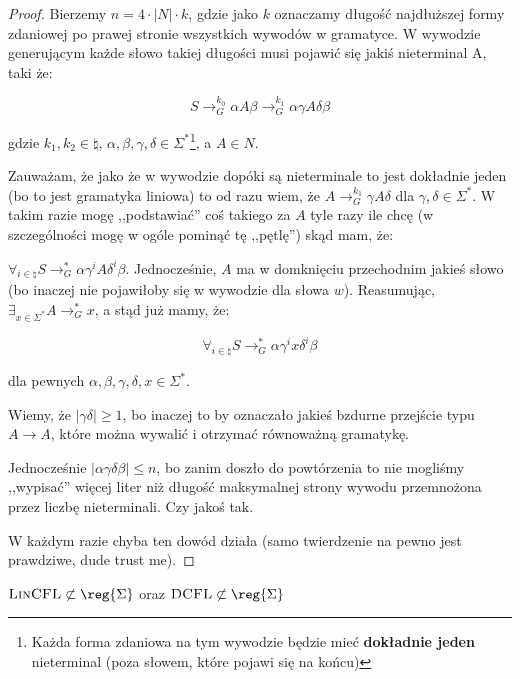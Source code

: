 \begin{proof}
    Bierzemy \(n = 4 \cdot |N| \cdot k \), gdzie jako \(k\) oznaczamy długość najdłuższej formy zdaniowej po prawej stronie wszystkich wywodów w gramatyce. W wywodzie generującym każde słowo takiej długości musi pojawić się jakiś nieterminal A, taki że:
    
    \[ 
        S \rightarrow_{G}^{k_0}\alpha A \beta \rightarrow_{G}^{k_1} \alpha \gamma A \delta \beta 
    \]
    
    gdzie \(k_1, k_2 \in \natural\), \(\alpha, \beta, \gamma, \delta \in \Sigma^* \)\footnote{Każda forma zdaniowa na tym wywodzie będzie mieć \textbf{dokładnie jeden} nieterminal (poza słowem, które pojawi się na końcu)}, a \(A \in N\). 
    
    Zauważam, że jako że w wywodzie dopóki są nieterminale to jest dokładnie jeden (bo to jest gramatyka liniowa) to od razu wiem, że \( A \rightarrow_G^{k_1} \gamma A \delta \) dla \( \gamma, \delta \in \Sigma^* \). W takim razie mogę ,,podstawiać'' coś takiego za \(A\) tyle razy ile chcę (w szczególności mogę w ogóle pominąć tę ,,pętlę'') skąd mam, że: 
    
    \(\forall_{i \in \natural} S \rightarrow_{G}^* \alpha \gamma^i A \delta^i \beta \). Jednocześnie, \(A\) ma w domknięciu przechodnim jakieś słowo (bo inaczej nie pojawiłoby się w wywodzie dla słowa \(w\)). Reasumując, \( \exists_{x \in \Sigma^*} A \rightarrow_G^* x \), a stąd już mamy, że: 
    
    \[ 
        \forall_{i \in \natural} S \rightarrow_{G}^* \alpha \gamma^i x \delta^i \beta 
    \] 
    
    dla pewnych \( \alpha, \beta, \gamma, \delta, x \in \Sigma^* \). 
    
    Wiemy, że \( |\gamma\delta| \geq 1 \), bo inaczej to by oznaczało jakieś bzdurne przejście typu \( A \rightarrow A\), które można wywalić i otrzymać równoważną gramatykę. 
    
    Jednocześnie \( |\alpha\gamma\delta\beta| \leq n\), bo zanim doszło do powtórzenia to nie mogliśmy ,,wypisać'' więcej liter niż długość maksymalnej strony wywodu przemnożona przez liczbę nieterminali. Czy jakoś tak.
    
    W każdym razie chyba ten dowód działa (samo twierdzenie na pewno jest prawdziwe, dude trust me). 
\end{proof}

\begin{theorem}
    \(\textsc{LinCFL} \not \subset \reg{\Sigma} \) oraz \(\textsc{DCFL} \not \subset \reg{\Sigma}\)
\end{theorem}

